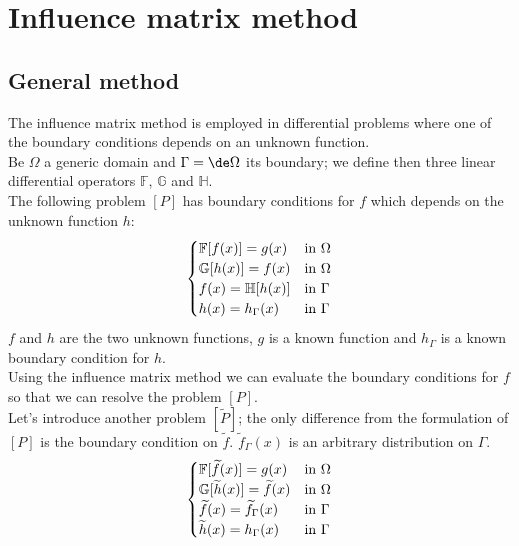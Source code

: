 \chapter{Influence matrix method}

\section{General method}
The influence matrix method is employed in differential problems where one of the boundary conditions depends on an unknown function.\\
Be $\Omega$ a generic domain and $\Gamma=\de\Omega$ its boundary; we define then three linear differential operators $\mathbb{F}$, $\mathbb{G}$ and $\mathbb{H}$.\\
The following problem $[P]$ has boundary conditions for $f$ which depends on the unknown function $h$:
\begin{equation}
[P]
\begin{cases}
\mathbb{F}[f(x)]=g(x) & \textnormal{in }\Omega\\
\mathbb{G}[h(x)]=f(x) & \textnormal{in }\Omega\\
f(x)=\mathbb{H}[h(x)] & \textnormal{in }\Gamma\\
h(x)=h_\Gamma(x) & \textnormal{in }\Gamma\\
\end{cases}
\end{equation}
$f$ and $h$ are the two unknown functions, $g$ is a known function and $h_\Gamma$ is a known boundary condition for $h$.\\
Using the influence matrix method we can evaluate the boundary conditions for $f$ so that we can resolve the problem $[P]$.\\
Let's introduce another problem $[\widetilde{P}]$; the only difference from the formulation of $[P]$ is the boundary condition on $\widetilde{f}$. $\widetilde{f}_\Gamma(x)$ is an arbitrary distribution on $\Gamma$.
\begin{equation}
[\widetilde{P}]
\begin{cases}
\mathbb{F}[\widetilde{f}(x)]=g(x) & \textnormal{in }\Omega\\
\mathbb{G}[\widetilde{h}(x)]=\widetilde{f}(x) & \textnormal{in }\Omega\\
\widetilde{f}(x)=\widetilde{f}_\Gamma(x) & \textnormal{in }\Gamma\\
\widetilde{h}(x)=h_\Gamma(x) & \textnormal{in }\Gamma\\
\end{cases}
\end{equation}
